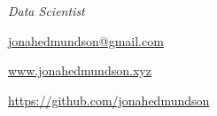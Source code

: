 \documentclass[11pt, a4paper]{article}
\begin{document}
\noindent
\begin{minipage}{0.6\textwidth}
\normalsize
\par
\vspace{0.2pc}
\hspace{18.4pc}
\textit{Data Scientist}
\end{minipage}\hfill
\hspace{2pc}\begin{minipage}{0.4\textwidth}
\begin{flushright}
\noindent \url{jonahedmundson@gmail.com}
\par
\noindent \url{www.jonahedmundson.xyz}
\par
\noindent \url{https://github.com/jonahedmundson}
\end{flushright}
\end{minipage}



\normalsize
\noindent
\end{document}
